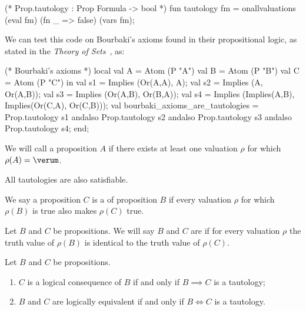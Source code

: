 \begin{node}[Semantics]
\begin{node}
\begin{sml}
(* Prop.tautology : Prop Formula -> bool *)
fun tautology fm = onallvaluations (eval fm) (fn _ => false) (vars fm);
\end{sml}
\begin{node}\label{prop:semantics-0002}%
We can test this code on Bourbaki's axioms found in their propositional
logic, as stated in the \textit{Theory of Sets}~\cite[(I~\S3.1)]{bourbaki1968theory}, as:
\begin{sml}
(* Bourbaki's axioms *)
local
    val A = Atom (P "A")
    val B = Atom (P "B")
    val C = Atom (P "C")
in
    val s1 = Implies (Or(A,A), A);
    val s2 = Implies (A, Or(A,B));
    val s3 = Implies (Or(A,B), Or(B,A));
    val s4 = Implies (Implies(A,B),
                      Implies(Or(C,A),
                              Or(C,B)));
    val bourbaki_axioms_are_tautologies = Prop.tautology s1 andalso
                                          Prop.tautology s2 andalso
                                          Prop.tautology s3 andalso
                                          Prop.tautology s4;
end;
\end{sml}
\end{node}
\end{node}

\begin{definition}\label{prop-000M}%
We will call a proposition $A$  if there exists at
least one valuation $\rho$ for which $\rho(A)=\verum$. 

\begin{node}\label{prop-000N}%
All tautologies are also satisfiable.
\end{node}
\end{definition}

\begin{definition}\label{prop-0005}%
We say a proposition $C$ is a  of
proposition $B$ if every valuation $\rho$ for which $\rho(B)$ is true
also makes $\rho(C)$ true.
\end{definition}

\begin{definition}\label{prop-0006}%
Let $B$ and $C$ be propositions. We will say $B$ and $C$ are
 if for every valuation $\rho$ the
truth value of $\rho(B)$ is identical to the truth value of $\rho(C)$.
\end{definition}

\begin{node}\label{prop-0007}%
Let $B$ and $C$ be propositions.
\begin{enumerate}
\item $C$ is a logical consequence of $B$ if and only if $B\implies C$
  is a tautology;
\item $B$ and $C$ are logically equivalent if and only if $B\iff C$ is a tautology.
\end{enumerate}
\end{node}


\end{node}
